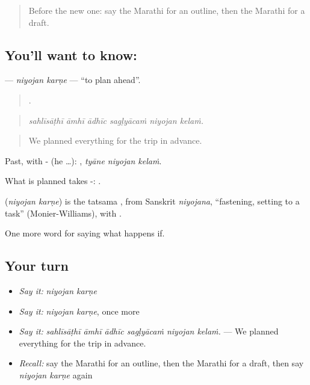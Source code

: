 \label{lesson:MR-C544-niyojan-karne}



\begin{quote}
Before the new one: say the Marathi for an outline, then the Marathi for a draft.
\end{quote}

\subsection*{You'll want to know:  }
\textbf{ } — \emph{niyojan karṇe} — \textquotedblleft{}to plan ahead\textquotedblright{}.

\begin{quote}
     .
\end{quote}

\begin{quote}
\emph{sahlīsāṭhī āmhī ādhīc sagḷyācaṁ niyojan kelaṁ.}
\end{quote}

\begin{quote}
We planned everything for the trip in advance.
\end{quote}

Past, with - (he …):   , \emph{tyāne niyojan kelaṁ}.

What is planned takes -:   .

\begin{cousinweb}
\textbf{ } (\emph{niyojan karṇe}) is the tatsama , from Sanskrit \emph{niyojana}, \textquotedblleft{}fastening, setting to a task\textquotedblright{} (Monier-Williams), with .
\end{cousinweb}

\begin{grammarlens}[title={What you've built}]
One more word for saying what happens if.
\end{grammarlens}

\subsection*{Your turn}
\begin{itemize}
\raggedright
  \item \emph{Say it:} \emph{niyojan karṇe}
  \item \emph{Say it:} \emph{niyojan karṇe}, once more
  \item \emph{Say it:} \emph{sahlīsāṭhī āmhī ādhīc sagḷyācaṁ niyojan kelaṁ.} — We planned everything for the trip in advance.
  \item \emph{Recall:} say the Marathi for an outline, then the Marathi for a draft, then say \emph{niyojan karṇe} again
\end{itemize}

